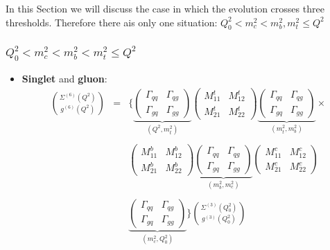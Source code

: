 \documentclass[10pt,a4paper]{article}
\begin{document}
In this Section we will discuss the case in which the evolution
crosses three thresholds. Therefore there ais only one situation:
$Q_0^2<m_c^2<m_b^2,m_t^2\leq Q^2$

\subsubsection{$Q_0^2<m_c^2<m_b^2<m_t^2\leq Q^2$}
\begin{itemize}
\item \textbf{Singlet} and \textbf{gluon}:
\begin{equation}
\begin{array}{rcl}
\displaystyle {\Sigma^{(6)}(Q^2) \choose g^{(6)}(Q^2)} &=& \displaystyle \Bigg\{\underbrace{\begin{pmatrix} \Gamma_{qq} & \Gamma_{qg} \\ \Gamma_{gq}& \Gamma_{gg}\end{pmatrix}}_{(Q^2,m_t^2)}\begin{pmatrix} M_{11}^t & M_{12}^t \\ M_{21}^t & M_{22}^t\end{pmatrix}\underbrace{\begin{pmatrix} \Gamma_{qq}& \Gamma_{qg} \\ \Gamma_{gq}& \Gamma_{gg}\end{pmatrix}}_{(m_t^2,m_b^2)}\times\\
\\
 & &\displaystyle\begin{pmatrix} M_{11}^b & M_{12}^b \\ M_{21}^b & M_{22}^b\end{pmatrix}\underbrace{\begin{pmatrix} \Gamma_{qq}& \Gamma_{qg} \\ \Gamma_{gq}& \Gamma_{gg}\end{pmatrix}}_{(m_b^2,m_c^2)}\begin{pmatrix} M_{11}^c & M_{12}^c \\ M_{21}^c & M_{22}^c\end{pmatrix}\\
\\
& &\displaystyle \underbrace{\begin{pmatrix} \Gamma_{qq}& \Gamma_{qg} \\ \Gamma_{gq}& \Gamma_{gg}\end{pmatrix}}_{(m_c^2,Q_0^2)}\Bigg\}{\Sigma^{(3)}(Q_0^2) \choose g^{(3)}(Q_0^2)}
\end{array}
\end{equation}

\end{itemize}
\end{document}
